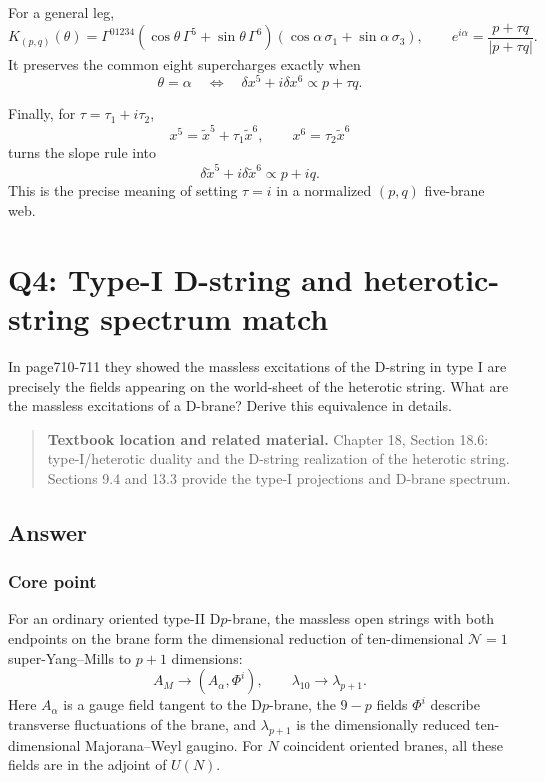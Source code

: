 \documentclass[
  10pt,
  a4paper,
  openany]{book}
\begin{document}
For a general leg, \[
\boxed{
K_{(p,q)}(\theta)
=\Gamma^{01234}
\left(\cos\theta\,\Gamma^5+\sin\theta\,\Gamma^6\right)
\left(\cos\alpha\,\sigma_1+\sin\alpha\,\sigma_3\right),
\qquad
e^{i\alpha}=\frac{p+\tau q}{|p+\tau q|}
}.
\] It preserves the common eight supercharges exactly when \[
\boxed{
\theta=\alpha
\quad\Longleftrightarrow\quad
\delta x^5+i\delta x^6\propto p+\tau q
}.
\]

Finally, for \(\tau=\tau_1+i\tau_2\), \[
\boxed{
x^5=\tilde x^5+\tau_1\tilde x^6,
\qquad
x^6=\tau_2\tilde x^6
}
\] turns the slope rule into \[
\boxed{
\delta\tilde x^5+i\delta\tilde x^6
\propto p+iq
}.
\] This is the precise meaning of setting \(\tau=i\) in a normalized
\((p,q)\) five-brane web.

\section{Q4: Type-I D-string and heterotic-string spectrum
match}\label{q4-type-i-d-string-and-heterotic-string-spectrum-match}

In page710-711 they showed the massless excitations of the D-string in
type I are precisely the fields appearing on the world-sheet of the
heterotic string. What are the massless excitations of a D-brane? Derive
this equivalence in details.

\begin{quote}
\textbf{Textbook location and related material.} Chapter 18, Section
18.6: type-I/heterotic duality and the D-string realization of the
heterotic string. Sections 9.4 and 13.3 provide the type-I projections
and D-brane spectrum.
\end{quote}

\subsection{Answer}\label{answer-39}

\subsubsection{Core point}\label{core-point-39}

For an ordinary oriented type-II D\(p\)-brane, the massless open strings
with both endpoints on the brane form the dimensional reduction of
ten-dimensional \(\mathcal N=1\) super-Yang--Mills to \(p+1\)
dimensions: \[
\boxed{
A_M
\longrightarrow
\left(A_\alpha,\Phi^i\right),
\qquad
\lambda_{10}
\longrightarrow
\lambda_{p+1}
}.
\] Here \(A_\alpha\) is a gauge field tangent to the D\(p\)-brane, the
\(9-p\) fields \(\Phi^i\) describe transverse fluctuations of the brane,
and \(\lambda_{p+1}\) is the dimensionally reduced ten-dimensional
Majorana--Weyl gaugino. For \(N\) coincident oriented branes, all these
fields are in the adjoint of \(U(N)\).
\end{document}
